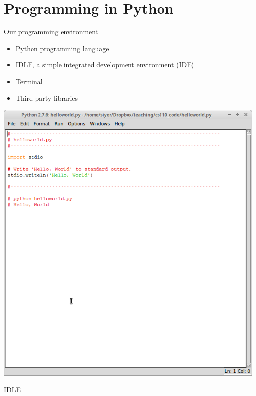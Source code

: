 \documentclass[8pt,a4paper,compress]{beamer}
\begin{document}
\section{Programming in Python}
\begin{frame}[fragile]
\begin{minipage}{200pt}
Our programming environment
\begin{itemize}
\item Python programming language  
\item IDLE, a simple integrated development environment (IDE)
\item Terminal
\item Third-party libraries
\end{itemize}
\end{minipage}%
\begin{minipage}{100pt}
\begin{center}
\includegraphics[scale=0.16]{figures/idle.png}

\smallskip

\tiny IDLE

\smallskip


\end{center}
\end{minipage}
\end{frame}
\end{document}

